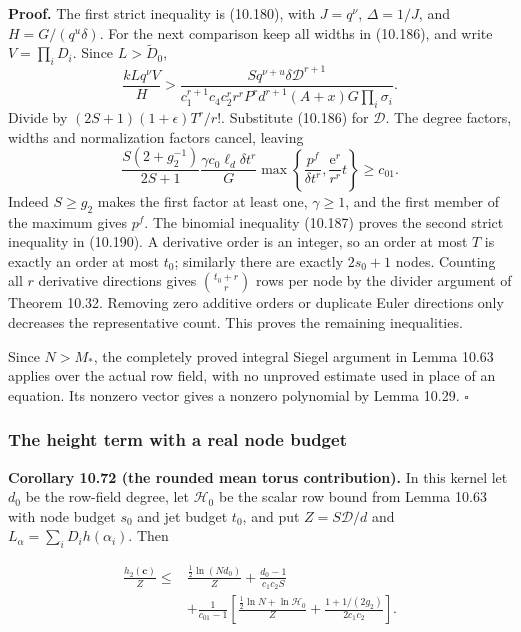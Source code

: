 \documentclass[
  11pt,
  a4paper,
]{article}
\begin{document}
\textbf{Proof.} The first strict inequality is (10.180), with
\(J=q^\nu\), \(\Delta=1/J\), and \(H=G/(q^u\delta)\). For the next
comparison keep all widths in (10.186), and write \(V=\prod_iD_i\).
Since \(L>\widetilde D_0\), \[
\frac{kLq^\nu V}{H}>
\frac{Sq^{\nu+u}\delta\mathcal D^{r+1}}
{c_1^{r+1}c_4c_2^rr^rP^rd^{r+1}(A+x)G\prod_i\sigma_i}.
\] Divide by \((2S+1)(1+\epsilon)T^r/r!\). Substitute (10.186) for
\(\mathcal D\). The degree factors, widths and normalization factors
cancel, leaving \[
\frac{S(2+g_2^{-1})}{2S+1}
\frac{\gamma c_0\ell_d\delta t^r}{G}
\max\left\{\frac{p^f}{\delta t^r},\frac{\mathrm e^r}{r^r}t\right\}
\ge c_{01}.
\] Indeed \(S\ge g_2\) makes the first factor at least one,
\(\gamma\ge1\), and the first member of the maximum gives \(p^f\). The
binomial inequality (10.187) proves the second strict inequality in
(10.190). A derivative order is an integer, so an order at most \(T\) is
exactly an order at most \(t_0\); similarly there are exactly \(2s_0+1\)
nodes. Counting all \(r\) derivative directions gives
\(\binom{t_0+r}{r}\) rows per node by the divider argument of Theorem
10.32. Removing zero additive orders or duplicate Euler directions only
decreases the representative count. This proves the remaining
inequalities.

Since \(N>M_*\), the completely proved integral Siegel argument in Lemma
10.63 applies over the actual row field, with no unproved estimate used
in place of an equation. Its nonzero vector gives a nonzero polynomial
by Lemma 10.29. \(\square\)

\subsubsection{The height term with a real node
budget}\label{the-height-term-with-a-real-node-budget}

\textbf{Corollary 10.72 (the rounded mean torus contribution).} In this
kernel let \(d_0\) be the row-field degree, let \(\mathcal H_0\) be the
scalar row bound from Lemma 10.63 with node budget \(s_0\) and jet
budget \(t_0\), and put \(Z=S\mathcal D/d\) and
\(L_\alpha=\sum_iD_i h(\alpha_i)\). Then

\[
\begin{aligned}
\frac{h_2(\boldsymbol c)}Z
\le{}&\frac{\tfrac12\ln(Nd_0)}Z
 +\frac{d_0-1}{c_1c_2S}\\
&+\frac1{c_{01}-1}\left[
\frac{\tfrac12\ln N+\ln\mathcal H_0}Z
 +\frac{1+1/(2g_2)}{2c_1c_2}
\right].
\end{aligned}
\tag{10.191}
\]
\end{document}
